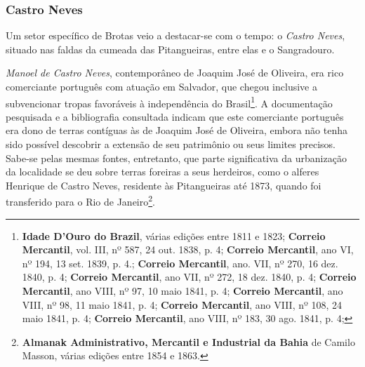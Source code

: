 \subsubsection{Castro Neves}\label{subsubsec:castroneves}

Um setor específico de Brotas veio a destacar-se com o tempo: o \textit{Castro Neves}, situado nas faldas da cumeada das Pitangueiras, entre elas e o Sangradouro.

\textit{Manoel de Castro Neves}, contemporâneo de Joaquim José de Oliveira, era rico comerciante português com atuação em Salvador, que chegou inclusive a subvencionar tropas favoráveis à independência do Brasil\footnote{\textbf{Idade D'Ouro do Brazil}, várias edições entre 1811 e 1823; \textbf{Correio Mercantil}, vol. III, nº 587, 24 out. 1838, p. 4; \textbf{Correio Mercantil}, ano VI, nº 194, 13 set. 1839, p. 4.; \textbf{Correio Mercantil}, ano. VII, nº 270, 16 dez. 1840, p. 4; \textbf{Correio Mercantil}, ano VII, nº 272, 18 dez. 1840, p. 4; \textbf{Correio Mercantil}, ano VIII, nº 97, 10 maio 1841, p. 4; \textbf{Correio Mercantil}, ano VIII, nº 98, 11 maio 1841, p. 4;  \textbf{Correio Mercantil}, ano VIII, nº 108, 24 maio 1841, p. 4; \textbf{Correio Mercantil}, ano VIII, nº 183, 30 ago. 1841, p. 4;}. A documentação pesquisada e a bibliografia consultada indicam que este comerciante português era dono de terras contíguas às de Joaquim José de Oliveira, embora não tenha sido possível descobrir a extensão de seu patrimônio ou seus limites precisos. Sabe-se pelas mesmas fontes, entretanto, que parte significativa da urbanização da localidade se deu sobre terras foreiras a seus herdeiros, como o alferes Henrique de Castro Neves, residente às Pitangueiras até 1873, quando foi transferido para o Rio de Janeiro\footnote{\textbf{Almanak Administrativo, Mercantil e Industrial da Bahia} de Camilo Masson, várias edições entre 1854 e 1863.}. 


